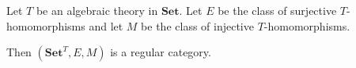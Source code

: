 Let $T$ be an algebraic theory in $\mathbf{Set}$. Let $E$ be the class of surjective $T$-homomorphisms and let $M$ be the class of injective $T$-homomorphisms.

Then $(\mathbf{Set}^T, E, M)$ is a regular category.
